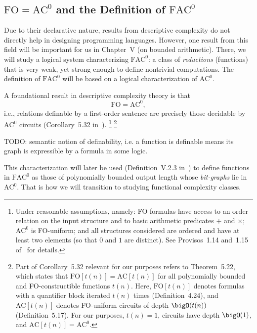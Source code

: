 \subsection{\texorpdfstring{$\mathrm{FO} = \mathrm{AC}^0$}{FO = AC0} and the Definition of \texorpdfstring{$\mathrm{FAC}^0$}{FAC0}}

Due to their declarative nature, results from descriptive complexity do not
directly help in designing programming languages.
However, one result from this field will be important for us in
Chapter~V (on bounded arithmetic). There, we will study a logical system
characterizing \(\mathrm{FAC}^0\): a class of \emph{reductions} (functions) that is very weak,
yet strong enough to define nontrivial computations.
The definition of \(\mathrm{FAC}^0\) will be based on a logical characterization of
\(\mathrm{AC}^0\).

A foundational result in descriptive complexity theory is that
\[
\mathrm{FO} = \mathrm{AC}^0,
\]
i.e., relations definable by a first-order sentence are precisely those
decidable by \(\mathrm{AC}^0\) circuits
(Corollary~5.32 in~\cite{Immerman1999-IMMDC}).%
\footnote{%
Under reasonable assumptions, namely:
FO formulas have access to an order relation on the input structure and to
basic arithmetic predicates \(+\) and \(\times\);
\(\mathrm{AC}^0\) is FO-uniform; and
all structures considered are ordered and have at least two elements (so that
\(0\) and \(1\) are distinct).
See Provisos~1.14 and~1.15 of~\cite{Immerman1999-IMMDC} for details.%
}
\footnote{%
Part of Corollary~5.32 relevant for our purposes refers to Theorem~5.22,
which states that \(\mathrm{FO}[t(n)] = \mathrm{AC}[t(n)]\)
for all polynomially bounded and FO-constructible functions \(t(n)\).
Here, \(\mathrm{FO}[t(n)]\) denotes formulas with a quantifier block iterated
\(t(n)\) times (Definition~4.24), and
\(\mathrm{AC}[t(n)]\) denotes FO-uniform circuits of depth \(\bigO(t(n))\)
(Definition~5.17).
For our purposes, \(t(n) = 1\), circuits have depth \(\bigO(1)\),
and \(\mathrm{AC}[t(n)] = \mathrm{AC}^0\).%
}

TODO: semantic notion of definability, i.e. a function is definable means
its graph is expressible by a formula in some logic.

This characterization will later be used (Definition~V.2.3 in~\cite{Cook_Nguyen_2010})
to define functions in \(\mathrm{FAC}^0\) as those of polynomially bounded output length
whose \emph{bit-graphs} lie in \(\mathrm{AC}^0\).
That is how we will transition to studying functional complexity classes.

